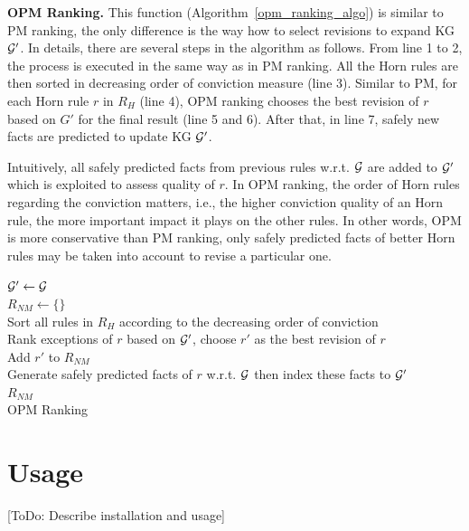 \textbf{OPM Ranking.} This function (Algorithm~\ref{opm_ranking_algo}) is similar to PM ranking, the only difference is the way how to select revisions to expand KG $\mathcal{G}'$. In details, there are several steps in the algorithm as follows. From line 1 to 2, the process is executed in the same way as in PM ranking. All the Horn rules are then sorted in decreasing order of conviction measure (line 3). Similar to PM, for each Horn rule $r$ in $R_H$ (line 4), OPM ranking chooses the best revision of $r$ based on $G'$ for the final result (line 5 and 6). After that, in line 7, safely new facts are predicted to update KG $\mathcal{G}'$.

Intuitively, all safely predicted facts from previous rules w.r.t. $\mathcal{G}$ are added to $\mathcal{G}'$ which is exploited to assess quality of $r$. In OPM ranking, the order of Horn rules regarding the conviction matters, i.e., the higher conviction quality of an Horn rule, the more important impact it plays on the other rules. In other words, OPM is more conservative than PM ranking, only safely predicted facts of better Horn rules may be taken into account to revise a particular one.

\IncMargin{1.5em}
\begin{algorithm}[H]
\DontPrintSemicolon
\SetAlgoLined
{}
\BlankLine
$\mathcal{G}' \leftarrow \mathcal{G}$\\
$R_{NM} \leftarrow \{\}$\\
Sort all rules in $R_H$ according to the decreasing order of conviction\\
\BlankLine
{} {
	Rank exceptions of $r$ based on $\mathcal{G}'$, choose $r'$ as the best revision of $r$\\
	Add $r'$ to $R_{NM}$\\
	Generate safely predicted facts of $r$ w.r.t. $\mathcal{G}$ then index these facts to $\mathcal{G}'$\\
}
\Return $R_{NM}$\\
\caption{OPM Ranking}
\label{opm_ranking_algo}
\end{algorithm}
\DecMargin{1.5em}

\section{Usage}

[ToDo: Describe installation and usage]
